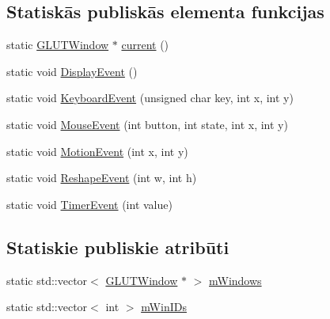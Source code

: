 \subsection*{Statiskās publiskās elementa funkcijas}
\begin{DoxyCompactItemize}
\item 
static \hyperlink{class_v_p_c_1_1_g_u_i_1_1_g_l_u_t_window}{G\+L\+U\+T\+Window} $\ast$ \hyperlink{class_v_p_c_1_1_g_u_i_1_1_g_l_u_t_window_ac04192559c661a6bc954609807df477d}{current} ()
\item 
static void \hyperlink{class_v_p_c_1_1_g_u_i_1_1_g_l_u_t_window_a8874ae9e61f82863cec3b3524c3b0d33}{Display\+Event} ()
\item 
static void \hyperlink{class_v_p_c_1_1_g_u_i_1_1_g_l_u_t_window_ad94b80f2d5d0d032aac9ee71b6fdcf9b}{Keyboard\+Event} (unsigned char key, int x, int y)
\item 
static void \hyperlink{class_v_p_c_1_1_g_u_i_1_1_g_l_u_t_window_ae838963ea1a595625bddfa31dd9cbabd}{Mouse\+Event} (int button, int state, int x, int y)
\item 
static void \hyperlink{class_v_p_c_1_1_g_u_i_1_1_g_l_u_t_window_a962cbc03bcbb5a0541978ec3630f65a6}{Motion\+Event} (int x, int y)
\item 
static void \hyperlink{class_v_p_c_1_1_g_u_i_1_1_g_l_u_t_window_a584bc6119237804393bc403de78031a3}{Reshape\+Event} (int w, int h)
\item 
static void \hyperlink{class_v_p_c_1_1_g_u_i_1_1_g_l_u_t_window_a3dd7ed12ee68dea02946415292139a0e}{Timer\+Event} (int value)
\end{DoxyCompactItemize}
\subsection*{Statiskie publiskie atribūti}
\begin{DoxyCompactItemize}
\item 
static std\+::vector$<$ \hyperlink{class_v_p_c_1_1_g_u_i_1_1_g_l_u_t_window}{G\+L\+U\+T\+Window} $\ast$ $>$ \hyperlink{class_v_p_c_1_1_g_u_i_1_1_g_l_u_t_window_aad2948c3a88afb3bc03f9bc54a81f285}{m\+Windows}
\item 
static std\+::vector$<$ int $>$ \hyperlink{class_v_p_c_1_1_g_u_i_1_1_g_l_u_t_window_a1ceb7745b98f3497579a0f4e8288419e}{m\+Win\+I\+Ds}
\end{DoxyCompactItemize}
